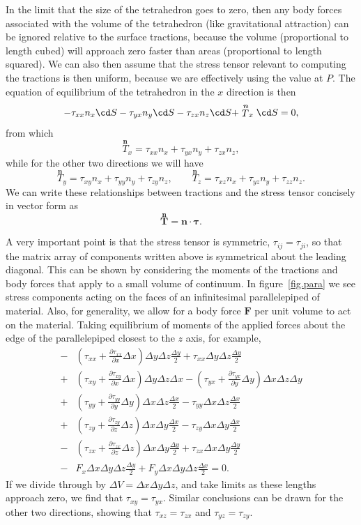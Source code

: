 \documentclass[twoside,11pt]		{report}
\begin{document}
In the limit that the size of the tetrahedron goes to zero, then any
body forces associated with the volume of the tetrahedron (like
gravitational attraction) can be ignored relative to the surface
tractions, because the volume (proportional to length cubed) will
approach zero faster than areas (proportional to length squared). We
can also then assume that the stress tensor relevant to computing the
tractions is then uniform, because we are effectively using the value
at $P$. The equation of equilibrium of the tetrahedron in the $x$
direction is then
\[
-\tau_{xx}n_x\cd S -\tau_{yx}n_y\cd S -\tau_{zx}n_z\cd S +
 \stackrel{\bm{n}}{T}_x\cd S = 0,
\]
from which
\[
\stackrel{\bm{n}}{T}_x = \tau_{xx}n_x + \tau_{yx}n_y + \tau_{zx}n_z,
\]
while for the other two directions we will have 
\[
\stackrel{\bm{n}}{T}_y = \tau_{xy}n_x + \tau_{yy}n_y + \tau_{zy}n_z,\qquad
\stackrel{\bm{n}}{T}_z = \tau_{xz}n_x + \tau_{yz}n_y + \tau_{zz}n_z.
\]
We can write these relationships between tractions and the stress
tensor concisely in vector form as
\[
\stackrel{\bm{n}}{\bm{T}} = \bm{n\cdot\tau}.
\]

A very important point is that the stress tensor is symmetric, \ie
$\tau_{ij}=\tau_{ji}$, so that the matrix array of components written
above is symmetrical about the leading diagonal. This can be shown by
considering the moments of the tractions and body forces that apply to
a small volume of continuum. In figure~\ref{fig.para} we see stress
components acting on the faces of an infinitesimal parallelepiped of
material. Also, for generality, we allow for a body force $\bm{F}$ per
unit volume to act on the material. Taking equilibrium of moments of
the applied forces about the edge of the parallelepiped closest to the
$z$ axis, for example,
\begin{align*}
-&\left(\tau_{xx}+\frac{\partial\tau_{xx}}{\partial x}\Delta x\right)
 \Delta y\Delta z\frac{\Delta y}{2} +
 \tau_{xx}\Delta y\Delta z\frac{\Delta y}{2}\\
+&\left(\tau_{xy}+\frac{\partial\tau_{xy}}{\partial x}\Delta x\right)
 \Delta y\Delta z\Delta x -
 \left(\tau_{yx}+\frac{\partial\tau_{yx}}{\partial y}\Delta y\right)
 \Delta x\Delta z\Delta y\\
+&\left(\tau_{yy}+\frac{\partial\tau_{yy}}{\partial y}\Delta y\right)
 \Delta x\Delta z\frac{\Delta x}{2} -
 \tau_{yy}\Delta x\Delta z\frac{\Delta x}{2}\\
+&\left(\tau_{zy}+\frac{\partial\tau_{zy}}{\partial z}\Delta z\right)
 \Delta x\Delta y\frac{\Delta x}{2} -
 \tau_{zy}\Delta x\Delta y\frac{\Delta x}{2}\\
-&\left(\tau_{zx}+\frac{\partial\tau_{zx}}{\partial z}\Delta z\right)
 \Delta x\Delta y\frac{\Delta y}{2} +
 \tau_{zx}\Delta x\Delta y\frac{\Delta y}{2}\\
-&F_x\Delta x\Delta y\Delta z\frac{\Delta y}{2}
+F_y\Delta x\Delta y\Delta z\frac{\Delta x}{2} = 0.
\end{align*}
If we divide through by $\Delta V=\Delta x\Delta y\Delta z$, and take
limits as these lengths approach zero, we find that
$\tau_{xy}=\tau_{yx}$. Similar conclusions can be drawn for the other
two directions, showing that $\tau_{xz}=\tau_{zx}$ and
$\tau_{yz}=\tau_{zy}$.
\end{document}
